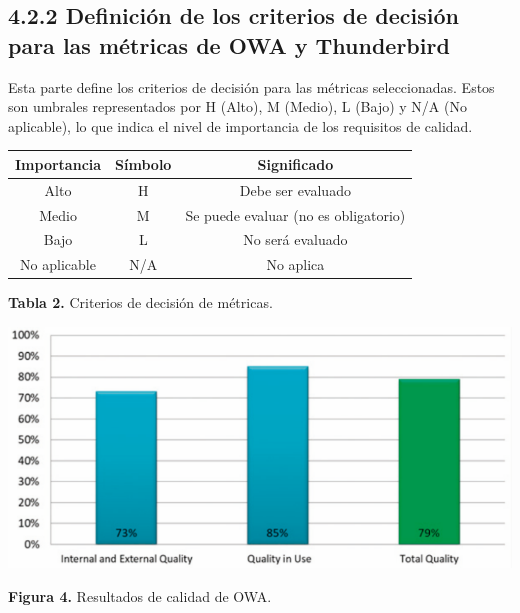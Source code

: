 \documentclass[https://www.overleaf.com/project/63761df255a8a9f4a15c3579
	letterpaper, %
	10pt, %
]{CSUniSchoolLabReport}
\begin{document}
            \subsection*{4.2.2 \hspace{0.5em} Definición de los criterios de decisión para las métricas de OWA y Thunderbird}
                Esta parte define los criterios de decisión para las métricas seleccionadas. Estos son umbrales representados por H (Alto), M (Medio), L (Bajo) y N/A (No aplicable), lo que indica el nivel de importancia de los requisitos de calidad.
                \\
                
               \begin{center}
                    \begin{tabular}{| c | c | c |}
                        \hline
                          Importancia & Símbolo & Significado\\ 
                        \hline
                            Alto & H & Debe ser evaluado\\
                            Medio & M & Se puede evaluar (no es obligatorio)\\
                            Bajo & L & No será evaluado\\
                            No aplicable & N/A & No aplica\\
                        \hline
                    \end{tabular}
                \end{center}
                
                \begin{center}
                    \textbf{Tabla 2.}\hspace{0.5em} Criterios de decisión de métricas.
                \end{center}

                \begin{center}
                    \includegraphics[width=1\linewidth]{image4.png}
                \end{center}
                \begin{center}
                    \textbf{Figura 4.}\hspace{0.5em} Resultados de calidad de OWA.
                \end{center}
\end{document}
